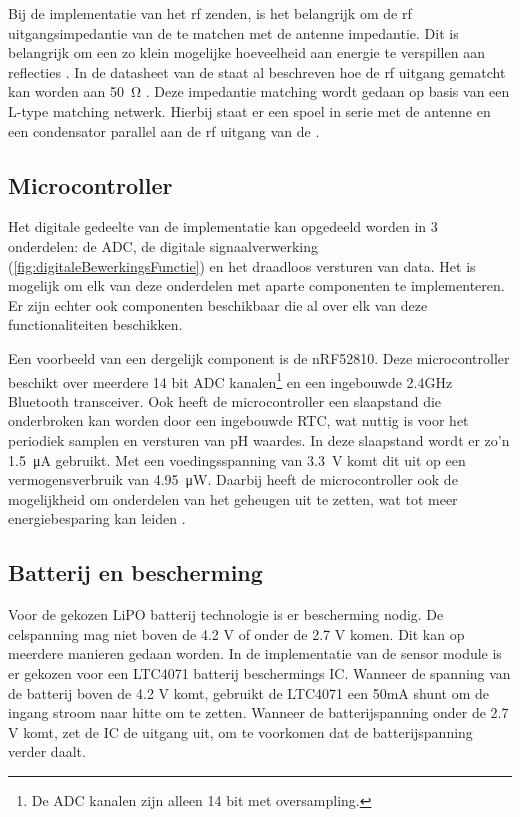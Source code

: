 Bij de implementatie van het rf zenden, is het belangrijk om de rf uitgangsimpedantie van de \mcu te matchen met de antenne impedantie. Dit is belangrijk om een zo klein mogelijke hoeveelheid aan energie te verspillen aan reflecties \cite{FundamentalsofAppliedElectromagnetics}. In de datasheet van de \mcu staat al beschreven hoe de rf uitgang gematcht kan worden aan \qty{50}{\ohm} \cite{nrf52810}. Deze impedantie matching wordt gedaan op basis van een L-type matching netwerk. Hierbij staat er een spoel in serie met de antenne en een condensator parallel aan de rf uitgang van de \mcu \cite{nrf52810}.

\subsection{Microcontroller}
Het digitale gedeelte van de implementatie kan opgedeeld worden in 3 onderdelen: de ADC, de digitale signaalverwerking (\cref{fig:digitaleBewerkingsFunctie}) en het draadloos versturen van data. Het is mogelijk om elk van deze onderdelen met aparte componenten te implementeren. Er zijn echter ook componenten beschikbaar die al over elk van deze functionaliteiten beschikken.

Een voorbeeld van een dergelijk component is de nRF52810. Deze microcontroller beschikt over meerdere 14 bit ADC kanalen\footnote{De ADC kanalen zijn alleen 14 bit met oversampling.} en een ingebouwde 2.4GHz Bluetooth transceiver.
Ook heeft de microcontroller een slaapstand die onderbroken kan worden door een ingebouwde RTC, wat nuttig is voor het periodiek samplen en versturen van pH waardes. In deze slaapstand wordt er zo'n \qty{1.5}{\micro\ampere} gebruikt. Met een voedingsspanning van \qty{3.3}{\volt} komt dit uit op een vermogensverbruik van \qty{4.95}{\micro\watt}. Daarbij heeft de microcontroller ook de mogelijkheid om onderdelen van het geheugen uit te zetten, wat tot meer energiebesparing kan leiden \cite{nrf52810}.


\subsection{Batterij en bescherming}

Voor de gekozen LiPO batterij technologie is er bescherming nodig. De celspanning mag niet boven de 4.2 V of onder de 2.7 V komen. Dit kan op meerdere manieren gedaan worden. In de implementatie van de sensor module is er gekozen voor een LTC4071 batterij beschermings IC. Wanneer de spanning van de batterij boven de 4.2 V komt, gebruikt de LTC4071 een 50mA shunt om de ingang stroom naar hitte om te zetten. Wanneer de batterijspanning onder de 2.7 V komt, zet de IC de uitgang uit, om te voorkomen dat de batterijspanning verder daalt.

